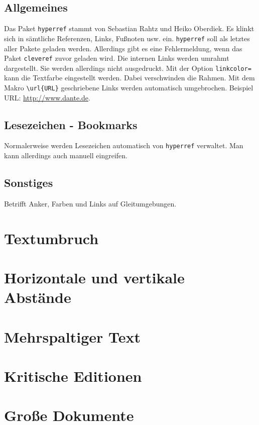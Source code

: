 \subsection{Allgemeines}
Das Paket \verb*+hyperref+ stammt von Sebastian Rahtz und Heiko Oberdiek. Es klinkt sich in sämtliche Referenzen, Links, Fußnoten usw. ein. \verb*+hyperref+ soll als letztes aller Pakete geladen werden. Allerdings gibt es eine Fehlermeldung, wenn das Paket \verb*+cleveref+ zuvor geladen wird. Die internen Links werden umrahmt dargestellt. Sie werden allerdings nicht ausgedruckt. Mit der Option \verb*+linkcolor=+ kann die Textfarbe eingestellt werden. Dabei verschwinden die Rahmen. Mit dem Makro \verb*+\url{URL}+ geschriebene Links werden automatisch umgebrochen. Beispiel URL: \url{http://www.dante.de}.
\subsection{Lesezeichen - Bookmarks}
Normalerweise werden Lesezeichen automatisch von \verb*+hyperref+ verwaltet. Man kann allerdings auch manuell eingreifen.
\subsection{Sonstiges}
Betrifft Anker, Farben und Links auf Gleitumgebungen.
\section{Textumbruch}
\section{Horizontale und vertikale Abstände}
\section{Mehrspaltiger Text}
\section{Kritische Editionen}
\section{Große Dokumente}



